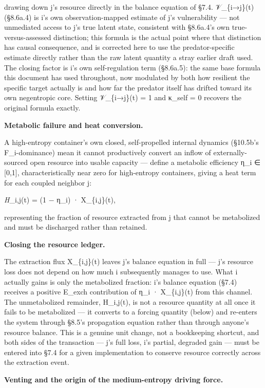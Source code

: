 \documentclass[
]{article}
\begin{document}
drawing down j's resource directly in the balance equation of §7.4.
𝒱\_\{i→j\}(t) (§8.6a.4) is i's own observation-mapped estimate of j's
vulnerability --- not unmediated access to j's true latent state,
consistent with §8.6a.4's own true-versus-assessed distinction; this
formula is the actual point where that distinction has causal
consequence, and is corrected here to use the predator-specific estimate
directly rather than the raw latent quantity a stray earlier draft used.
The closing factor is i's own self-regulation term (§8.6a.5): the same
base formula this document has used throughout, now modulated by both
how resilient the specific target actually is and how far the predator
itself has drifted toward its own negentropic core. Setting
𝒱\_\{i→j\}(t) = 1 and κ\_self = 0 recovers the original formula exactly.

\textbf{Metabolic failure and heat conversion.}

A high-entropy container's own closed, self-propelled internal dynamics
(§10.5b's F\_i-dominance) mean it cannot productively convert an inflow
of externally-sourced open resource into usable capacity --- define a
metabolic efficiency η\_i ∈ {[}0,1{]}, characteristically near zero for
high-entropy containers, giving a heat term for each coupled neighbor j:

\emph{H}\_i,j(t) = (1 − η\_i) · X\_\{i,j\}(t),

representing the fraction of resource extracted from j that cannot be
metabolized and must be discharged rather than retained.

\textbf{Closing the resource ledger.}

The extraction flux X\_\{i,j\}(t) leaves j's balance equation in full
--- j's resource loss does not depend on how much i subsequently manages
to use. What i actually gains is only the metabolized fraction: i's
balance equation (§7.4) receives a positive E\_exch contribution of η\_i
· X\_\{i,j\}(t) from this channel. The unmetabolized remainder,
H\_i,j(t), is not a resource quantity at all once it fails to be
metabolized --- it converts to a forcing quantity (below) and re-enters
the system through §8.5's propagation equation rather than through
anyone's resource balance. This is a genuine unit change, not a
bookkeeping shortcut, and both sides of the transaction --- j's full
loss, i's partial, degraded gain --- must be entered into §7.4 for a
given implementation to conserve resource correctly across the
extraction event.

\textbf{Venting and the origin of the medium-entropy driving force.}
\end{document}

